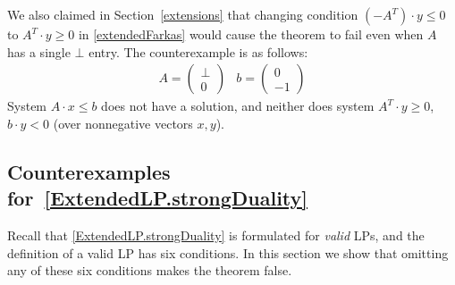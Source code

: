 \documentclass[]{article}
\renewcommand{\.}{\hskip .75pt}
\newcommand{\sekt}[1]{Section~\ref{#1}}
\let\*=\cdot
\begin{document}
We also claimed in \sekt{extensions} that changing condition $(-A^T) \* y \le 0$
to  $A^T \* y \ge 0$ in  \ref{extendedFarkas} would cause the theorem
to fail even when $A$ has a single $\bot$ entry. The counterexample is as follows:
$$
\begin{array}{cc}
A =
\begin{pmatrix}
	\bot  \\
	0 
\end{pmatrix}
&
b = \begin{pmatrix} 0 \\ -1 \end{pmatrix}
\end{array}
$$
System $A \* x\le b$ does not have a solution, and neither does system
$A^T \* y \ge 0$, $b \* y < 0$ (over nonnegative vectors $x,y$).

\subsection{Counterexamples for~\ref{ExtendedLP.strongDuality}}\label{sec:ExtendedLP.strongDuality:counterexamples}
Recall that \ref{ExtendedLP.strongDuality} is formulated for {\em valid} LPs,
and the definition of a valid LP has six conditions.
In this section we show that omitting any of these six conditions
makes the theorem false.
\end{document}
